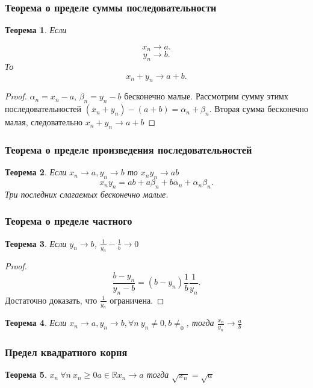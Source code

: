 \documentclass{article}
\newtheorem{theorem}{Теорема}
\begin{document}
\subsubsection{Теорема о пределе суммы последовательности}
\begin{theorem}
Если 

    \[
    
    x_n \to a
    .\] 
    \[
    y_n \to b
    .\] 
    То
    \[
    x_n + y_n \to a + b
    .\] 
\end{theorem}
\begin{proof}
    $\alpha_n = x_n - a$,  $\beta_n = y_n - b$ бесконечно малые. 
    Рассмотрим  сумму этимх последовательностей $(x_n + y_n) - (a + b) = \alpha_n + \beta_n$. Вторая сумма бесконечно малая, следовательно  $x_n + y_n \to a + b$
\end{proof}
\subsubsection{Теорема о пределе произведения последовательностей}
\begin{theorem}
    Если $x_n \to a, y_n \to b $ то $ x_n y_n \to ab$
    \[
    x_n y_n = ab + a\beta_n + b \alpha_n + \alpha_n \beta_n
    .\] 
    Три последних слагаемых бесконечно малые.
\end{theorem}
\subsubsection{Теорема о пределе частного}
 \begin{theorem}
Если $y_n \to b$, $\frac{1}{y_n} - \frac{1}{b} \to 0$
\end{theorem}
\begin{proof}
   \[
       \frac{b - y_n}{y_n- b} = (b - y_n)  \frac{1}{b}\frac{1}{y_n}
   .\] 
   Достаточно доказать, что $\frac{1}{y_n}$ ограничена.
\end{proof}
\begin{theorem}
    Если $x_n \to a, y_n \to b , \forall n ~ y_n \neq 0, b\neq_0$, тогда
    $\frac{x_n}{y_n} \to \frac{a}{b}$
\end{theorem}
\subsubsection{Предел квадратного корня}
\begin{theorem}
    $x_n ~\forall n ~x_n \ge 0  a \in \mathbb{R} x_n \to a$ тогда $\sqrt{x_n} = \sqrt{a}$
\end{theorem}
\end{document}
